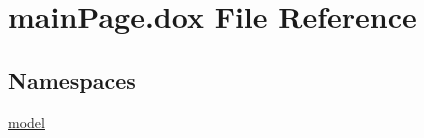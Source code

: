 \hypertarget{main_page_8dox}{}\section{main\+Page.\+dox File Reference}
\label{main_page_8dox}
\subsection*{Namespaces}
\begin{DoxyCompactItemize}
\item 
 \hyperlink{namespacemodel}{model}
\end{DoxyCompactItemize}
